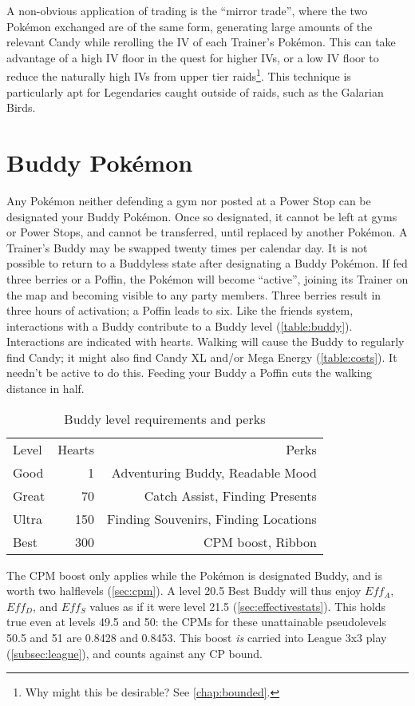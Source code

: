 A non-obvious application of trading is the ``mirror trade'', where the
 two Pokémon exchanged are of the same form, generating large amounts
 of the relevant Candy while rerolling the IV of each Trainer's Pokémon.
This can take advantage of a high IV floor in the quest for higher IVs, or
 a low IV floor to reduce the naturally high IVs from upper tier raids\footnote{Why might this be desirable? See \autoref{chap:bounded}.}.
This technique is particularly apt for Legendaries caught outside of raids,
 such as the Galarian Birds.

\section{Buddy Pokémon\label{sec:buddies}}
Any Pokémon neither defending a gym nor posted at a Power Stop can be designated your Buddy Pokémon.
Once so designated, it cannot be left at gyms or Power Stops, and cannot be transferred,
  until replaced by another Pokémon.
A Trainer's Buddy may be swapped twenty times per calendar day.
It is not possible to return to a Buddyless state after designating a Buddy Pokémon.
If fed three berries or a Poffin, the Pokémon will become ``active'',
  joining its Trainer on the map and becoming visible to any party members.
Three berries result in three hours of activation; a Poffin leads to six.
Like the friends system, interactions with a Buddy contribute to a Buddy level (\autoref{table:buddy}).
Interactions are indicated with hearts.
Walking will cause the Buddy to regularly find Candy; it might also find Candy XL
  and/or Mega Energy (\autoref{table:costs}).
It needn't be active to do this.
Feeding your Buddy a Poffin cuts the walking distance in half.
\begin{table}
\centering
\begin{tabular}{lrr}
Level & Hearts & Perks\\
\Midrule
Good & 1 & Adventuring Buddy, Readable Mood\\
Great & 70 & Catch Assist, Finding Presents\\
Ultra & 150 & Finding Souvenirs, Finding Locations\\
Best & 300 & CPM boost, Ribbon\\
\end{tabular}
\caption{Buddy level requirements and perks\label{table:buddy}}
\end{table}
The CPM boost only applies while the Pokémon is designated Buddy,
  and is worth two halflevels (\autoref{sec:cpm}).
A level 20.5 Best Buddy will thus enjoy $Eff_A$, $Eff_D$, and $Eff_S$ values
  as if it were level 21.5 (\autoref{sec:effectivestats}).
This holds true even at levels 49.5 and 50: the CPMs for these unattainable
  pseudolevels 50.5 and 51 are 0.8428 and 0.8453.
This boost \textit{is} carried into League 3x3 play (\autoref{subsec:league}),
  and counts against any CP bound.

